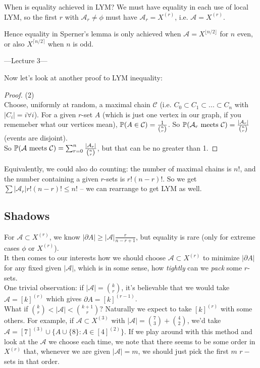 \documentclass[a4paper]{article}
\begin{document}
When is equality achieved in LYM? We must have equality in each use of local LYM, so the first $r$ with $\mathcal{A}_r \neq \phi$ must have $\mathcal{A}_r = X^{(r)}$, i.e. $\mathcal{A} = X^{(r)}$.

Hence equality in Sperner's lemma is only achieved when $\mathcal{A} = X^{\lfloor n/2 \rfloor}$ for $n$ even, or also $X^{\lceil n/2 \rceil}$ when $n$ is odd.

---Lecture 3---

Now let's look at another proof to LYM inequality:
\begin{proof} (2) \\
    Choose, uniformly at random, a maximal chain $\mathcal{C}$ (i.e. $C_0 \subset C_1 \subset ... \subset C_n$ with $|C_i| =i \forall i$). For a given $r$-set $A$ (which is just one vertex in our graph, if you rememeber what our vertices mean), $\P(A \in \mathcal{C}) = \frac{1}{{n \choose r}}$. So $\P(\mathcal{A}_r \text{ meets } \mathcal{C}) = \frac{|\mathcal{A}_r|}{{n \choose r}}$ (events are disjoint).\\
    So $\P(\mathcal{A} \text{ meets } \mathcal{C}) = \sum_{r=0}^n \frac{|\mathcal{A}_r|}{{n \choose r}}$, but that can be no greater than 1.
\end{proof}

\begin{rem}
    Equivalently, we could also do counting: the number of maximal chains is $n!$, and the number containing a given $r$-sets is $r!(n-r)!$. So we get $\sum|\mathcal{A}_r|r!(n-r)! \leq n!$ -- we can rearrange to get LYM as well.
\end{rem}

\subsection{Shadows}
For $\mathcal{A} \subset X^{(r)}$, we know $|\partial A| \geq |\mathcal{A}| \frac{r}{n-r+1}$, but equality is rare (only for extreme cases $\phi$ or $X^{(r)}$).\\
It then comes to our interests how we should choose $\mathcal{A} \subset X^{(r)}$ to minimize $|\partial A|$ for any fixed given $|\mathcal{A}|$, which is in some sense, how \emph{tightly} can we \emph{pack} some $r$-sets.\\
One trivial observation: if $|\mathcal{A}| = {k \choose r}$, it's believable that we would take $\mathcal{A} = [k]^{(r)}$ which gives $\partial A =[k]^{(r-1)}$.\\
What if ${k \choose r} < |\mathcal{A}| < {{k+1} \choose r}$? Naturally we expect to take $[k]^{(r)}$ with some others. For example, if $\mathcal{A} \subset X^{(3)}$ with $|\mathcal{A}| = {7 \choose 3} + {4 \choose 2}$, we'd take $\mathcal{A} = [7]^{(3)} \cup \{A \cup \{8\}: A \in [4]^{(2)}\}$. If we play around with this method and look at the $\mathcal{A}$ we choose each time, we note that there seems to be some order in $X^{(r)}$ that, whenever we are given $|\mathcal{A}| = m$, we should just pick the first $m$ $r-$sets in that order.
\end{document}
